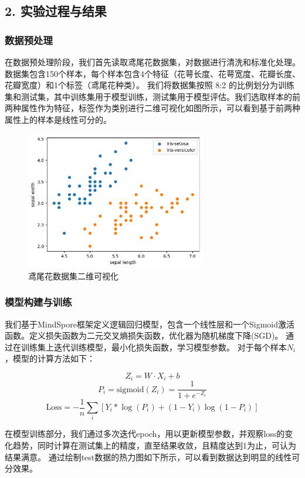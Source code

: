 \documentclass[12pt]{ctexart}
\begin{document}
\subsection*{2. 实验过程与结果}

\subsubsection*{数据预处理}

在数据预处理阶段，我们首先读取鸢尾花数据集，对数据进行清洗和标准化处理。数据集包含150个样本，每个样本包含4个特征（花萼长度、花萼宽度、花瓣长度、花瓣宽度）和1个标签（鸢尾花种类）。
我们将数据集按照 8:2 的比例划分为训练集和测试集，其中训练集用于模型训练，测试集用于模型评估。我们选取样本的前两种属性作为特征，标签作为类别进行二维可视化如图所示，可以看到基于前两种属性上的样本是线性可分的。

\begin{figure}[H]
    \centering
    \includegraphics[width=0.7\textwidth]{image/output6.png}
    \caption{鸢尾花数据集二维可视化}
\end{figure}

\subsubsection*{模型构建与训练}

我们基于MindSpore框架定义逻辑回归模型，包含一个线性层和一个Sigmoid激活函数。定义损失函数为二元交叉熵损失函数，优化器为随机梯度下降(SGD)。
通过在训练集上迭代训练模型，最小化损失函数，学习模型参数。
对于每个样本\(N_i\)，模型的计算方法如下：

\[ 
    Z_i = W \cdot X_i + b
\]
\[
    P_{i} = \text{sigmoid}(Z_{i}) = \frac{1}{1 + e^{-Z_{i}}} 
\]
\[
    \text{Loss} = -\frac{1}n\sum_i[Y_{i} * \log(P_{i}) + (1 - Y_{i})\log(1 - P_{i})]
\]


在模型训练部分，我们通过多次迭代epoch，用以更新模型参数，并观察loss的变化趋势，同时计算在测试集上的精度，直至结果收敛，且精度达到1为止，可认为结果满意。
通过绘制test数据的热力图如下所示，可以看到数据达到明显的线性可分效果。
\end{document}
